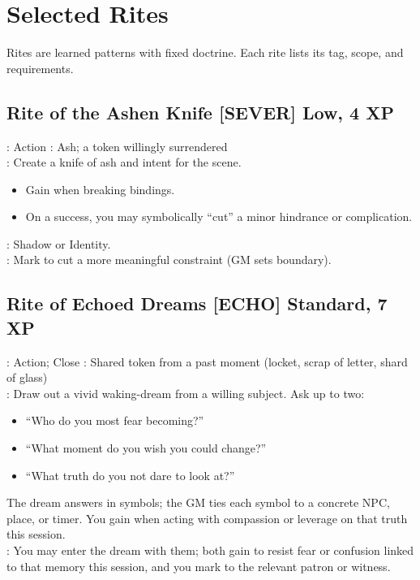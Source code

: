 \section{Selected Rites}
Rites are learned patterns with fixed doctrine. Each rite lists its tag, scope, and requirements.

\subsection{Rite of the Ashen Knife \hfill \textnormal{[SEVER] Low, 4 XP}}
\begin{RiteBox}
: Action \quad
{}: Ash; a token willingly surrendered \\
: Create a knife of ash and intent for the scene.
\begin{itemize}
  \item Gain  when breaking bindings.
  \item On a success, you may symbolically ``cut'' a minor hindrance or complication.
\end{itemize}
: Shadow or Identity. \\
: Mark  to cut a more meaningful constraint (GM sets boundary).
\end{RiteBox}

\subsection{Rite of Echoed Dreams \hfill \textnormal{[ECHO] Standard, 7 XP}}
\begin{RiteBox}
: Action; Close \quad
{}: Shared token from a past moment (locket, scrap of letter, shard of glass) \\
: Draw out a vivid waking-dream from a willing subject. Ask up to two:
\begin{itemize}
  \item ``Who do you most fear becoming?''
  \item ``What moment do you wish you could change?''
  \item ``What truth do you not dare to look at?''
\end{itemize}
The dream answers in symbols; the GM ties each symbol to a concrete NPC, place, or timer. You gain  when acting with compassion or leverage on that truth this session. \\
: You may enter the dream with them; both gain  to resist fear or confusion linked to that memory this session, and you mark  to the relevant patron or witness.
\end{RiteBox}

